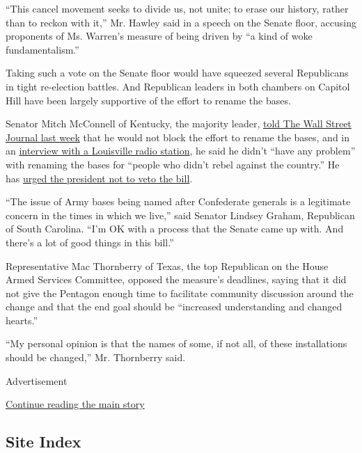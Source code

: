 ``This cancel movement seeks to divide us, not unite; to erase our
history, rather than to reckon with it,'' Mr. Hawley said in a speech on
the Senate floor, accusing proponents of Ms. Warren's measure of being
driven by ``a kind of woke fundamentalism.''

Taking such a vote on the Senate floor would have squeezed several
Republicans in tight re-election battles. And Republican leaders in both
chambers on Capitol Hill have been largely supportive of the effort to
rename the bases.

Senator Mitch McConnell of Kentucky, the majority leader,
\href{https://www.wsj.com/articles/mitch-mcconnell-signals-limits-on-race-related-policy-changes-11594733555}{told
The Wall Street Journal last week} that he would not block the effort to
rename the bases, and in an
\href{https://www.wdrb.com/news/one-on-one-sen-mitch-mcconnell-backs-rebranding-military-bases-named-for-confederate-leaders/article_78838c9c-bfd4-11ea-babc-3b697035a8fa.html}{interview
with a Louisville radio station}, he said he didn't ``have any problem''
with renaming the bases for ``people who didn't rebel against the
country.'' He has
\href{https://thehill.com/homenews/senate/505475-mcconnell-trump-shouldnt-veto-defense-bill-over-renaming-confederate-bases}{urged
the president not to veto the bill}.

``The issue of Army bases being named after Confederate generals is a
legitimate concern in the times in which we live,'' said Senator Lindsey
Graham, Republican of South Carolina. ``I'm OK with a process that the
Senate came up with. And there's a lot of good things in this bill.''

Representative Mac Thornberry of Texas, the top Republican on the House
Armed Services Committee, opposed the measure's deadlines, saying that
it did not give the Pentagon enough time to facilitate community
discussion around the change and that the end goal should be ``increased
understanding and changed hearts.''

``My personal opinion is that the names of some, if not all, of these
installations should be changed,'' Mr. Thornberry said.

Advertisement

\protect\hyperlink{after-bottom}{Continue reading the main story}

\hypertarget{site-index}{%
\subsection{Site Index}\label{site-index}}

